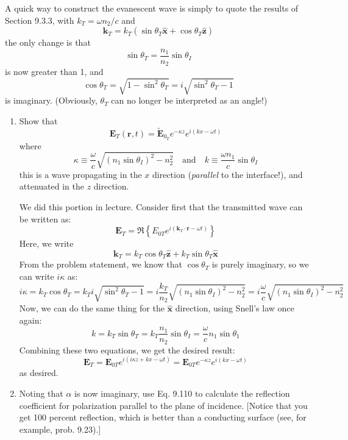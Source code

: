 \documentclass[10pt]{article}
\begin{document}
	A quick way to construct the evanescent wave is simply to quote the results of Section 9.3.3, with \( k_T
	= \omega n_2 / c\) and
	\[
		\mathbf{k}_T = k_T (\sin \theta_T \hat{\mathbf{x}} + \cos \theta_T \hat{\mathbf{z}})
	\]
	the only change is that
	\[
		\sin \theta_T = \frac{n_1}{n_2}\sin \theta_I
	\]
	is now greater than 1, and 
	\[
		\cos \theta_T = \sqrt{1 - \sin^2 \theta_T} = i\sqrt{\sin^2 \theta_T - 1}
	\]
	is imaginary. (Obviously, \( \theta_T \) can no longer be interpreted as an angle!)
	\begin{enumerate}[label=(\alph*)]
		\item Show that 
			\[
				\mathbf{E}_T(\mathbf{r}, t) = \tilde{\mathbf{E}}_{0_T} e^{-\kappa z}e^{i(kx - \omega t)}
			\]
			where 
			\[
				\kappa \equiv \frac{\omega}{c} \sqrt{(n_1 \sin \theta_I)^2 - n_2^2} \quad \text{and} \quad
				k\equiv \frac{\omega n_1}{c}\sin \theta_I
			\]
			this is a wave propagating in the \( x \) direction (\textit{parallel} to the interface!), and
			attenuated in the \( z \) direction. 

			\begin{solution}
				We did this portion in lecture. Consider first that the transmitted wave can be written as:
				\[
					\mathbf{E}_T = \Re\left\{ E_{0T} e^{i(\mathbf{k}_T \cdot \mathbf{r} - \omega t)} \right\}
				\]
				Here, we write
				\[
					\mathbf{k}_T = k_T \cos \theta_T \mathbf{\hat{z}} + k_T \sin \theta_T \mathbf{\hat{x}}
				\]
				From the problem statement, we know that \( \cos \theta_T \) is purely imaginary, so we can
				write \( i \kappa \) as:
				\[
					i \kappa = k_T \cos \theta_T = k_T i\sqrt{\sin^2 \theta_T - 1} = i \frac{k_T}{n_2}
					\sqrt{(n_1 \sin \theta_I)^2 - n_2^2} = i \frac{\omega}{c}\sqrt{(n_1 \sin \theta_I)^2 -
					n_2^2}
				\]
				Now, we can do the same thing for the \( \mathbf{\hat{x}} \) direction, using Snell's law
				once again:
				\[
					k = k_T \sin \theta_T = k_T \frac{n_1}{n_2} \sin \theta_I = \frac{\omega}{c} n_1 \sin
					\theta_1
				\]
				Combining these two equations, we get the desired result:
				\[
					\mathbf{E}_T = \mathbf{E}_{0T}e^{i(i \kappa z+ k x - \omega t)} = \mathbf{E}_{0T}
					e^{-\kappa z}e^{i (kx - \omega t)}
				\]
				as desired. 
			\end{solution}
		\item Noting that \( \alpha \) is now imaginary, use Eq. 9.110 to calculate the reflection
			coefficient for polarization parallel to the plane of incidence. [Notice that you get 100 percent
			reflection, which is better than a conducting surface (see, for example, prob. 9.23).]


\end{enumerate}
\end{document}
